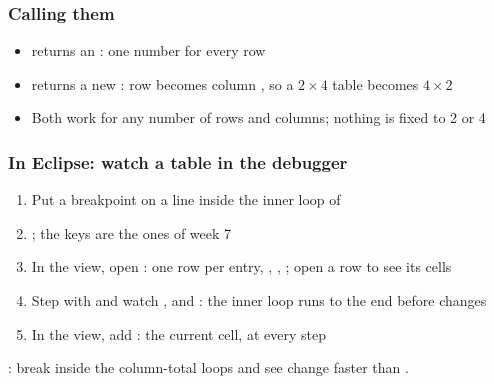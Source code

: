 \documentclass[aspectratio=169,10pt,compress]{beamer}
\newif\ifEclipseLab  \EclipseLabtrue   %
\begin{document}
\begin{frame}[t,fragile] \frametitle{Calling them}

	\begin{itemize}\small
		\item {} returns an : one number for every row
		\item {} returns a new : row  becomes column ,
			  so a $2 \times 4$ table becomes $4 \times 2$
		\item Both work for any number of rows and columns; nothing is fixed to 2 or 4
	\end{itemize}
\end{frame}



\ifEclipseLab %




\begin{frame}[t,fragile] \frametitle{In Eclipse: watch a table in the debugger}
	\begin{enumerate}\small
		\item Put a breakpoint on a line inside the inner loop of 
		\item {}; the keys are the ones of week 7
		\item In the  view, open : one row per entry, \hCode{[0]}, \hCode{[1]}, \hCode{[2]};
			  open a row to see its cells
		\item Step with  and watch ,  and : the inner loop
			  runs to the end before  changes
		\item In the  view, add : the current cell, at every step
	\end{enumerate}

	\vspace{0.5em}
	\small {}: break inside the column-total loops and see  change faster than .
\end{frame}
\end{document}
